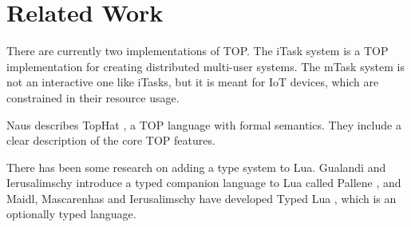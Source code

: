 \chapter{Related Work}\label{relatedwork}

There are currently two implementations of TOP.
The iTask system \cite{plasmeijer2007itasks} is a TOP implementation for creating distributed multi-user systems.
The mTask system \cite{koopman2018task, lubbers2019multitasking} is not an interactive one like iTasks, but it is meant for IoT devices, which are constrained in their resource usage.

Naus describes TopHat \cite{naus2020assisting}, a TOP language with formal semantics. They include a clear description of the core TOP features.

There has been some research on adding a type system to Lua. Gualandi and Ierusalimschy introduce a typed companion language to Lua called Pallene \cite{gualandi2020pallene}, and Maidl, Mascarenhas and Ierusalimschy have developed Typed Lua \cite{maidl2014typed}, which is an optionally typed language.
